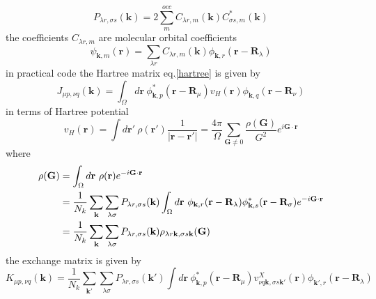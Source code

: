 \documentclass{article}
\begin{document}
            \begin{equation}
                P_{\lambda r,\sigma s}(\textbf{k}) = 2\sum_m^{occ}C_{\lambda r,m}(\textbf{k})C_{\sigma s,m}^*(\textbf{k})
            \end{equation}
            the coefficients $C_{\lambda r,m}$ are molecular orbital coefficients
            \begin{equation}
                \psi_{\textbf{k},m}(\textbf{r}) = \sum_{\lambda r}C_{\lambda r,m}(\textbf{k})\phi_{\textbf{k},r}(\textbf{r}-\textbf{R}_{\lambda})
            \end{equation} 
            in practical code the Hartree matrix eq.\eqref{hartree} is given by
            \begin{equation}
                J_{\mu p,\nu q}(\textbf{k}) = \int_{\Omega}d\textbf{r}\ \phi_{\textbf{k},p}^*(\textbf{r}-\textbf{R}_{\mu})v_H(\textbf{r})\phi_{\textbf{k},q}(\textbf{r}-\textbf{R}_{\nu})\label{hartree_code}
            \end{equation}
            in terms of Hartree potential
            \begin{equation}
                v_H(\textbf{r}) = \int d\textbf{r}'\ \rho(\textbf{r}')\frac{1}{\left|\textbf{r}-\textbf{r}'\right|} = \frac{4\pi}{\Omega}\sum_{\textbf{G}\neq 0}\frac{\rho(\textbf{G})}{G^2}e^{i\textbf{G}\cdot\textbf{r}}
            \end{equation}
            where
            \begin{align}
                \rho(\textbf{G}) &= \int_{\Omega}d\textbf{r}\ \rho(\textbf{r})e^{-i\textbf{G}\cdot\textbf{r}}\notag\\
                &= \frac{1}{N_k}\sum_{\textbf{k}}\sum_{\lambda\sigma}P_{\lambda r,\sigma s}(\textbf{k})\int_{\Omega}d\textbf{r}\ \phi_{\textbf{k},r}(\textbf{r}-\textbf{R}_{\lambda})\phi_{\textbf{k},s}^*(\textbf{r}-\textbf{R}_{\sigma})e^{-i\textbf{G}\cdot\textbf{r}}\notag\\
                &= \frac{1}{N_k}\sum_{\textbf{k}}\sum_{\lambda\sigma}P_{\lambda r,\sigma s}(\textbf{k})\rho_{\lambda r\textbf{k},\sigma s\textbf{k}}(\textbf{G})
            \end{align}
            the exchange matrix is given by
            \begin{equation}
                K_{\mu p,\nu q}(\textbf{k}) = \frac{1}{N_k}\sum_{\textbf{k}'}\sum_{\lambda\sigma}P_{\lambda r,\sigma s}(\textbf{k}')\int d\textbf{r}\ \phi_{\textbf{k},p}^*(\textbf{r}-\textbf{R}_{\mu})v_{\nu q\textbf{k},\sigma s\textbf{k}'}^X(\textbf{r})\phi_{\textbf{k}',r}(\textbf{r}-\textbf{R}_{\lambda})
            \end{equation}
\end{document}
